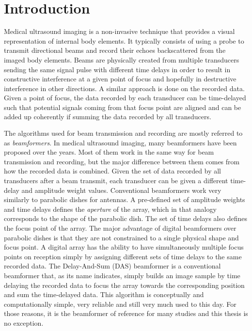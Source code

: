 \chapter{Introduction}

Medical ultrasound imaging is a non-invasive technique that provides a visual representation of internal body elements. It typically consists of using a probe to transmit directional beams and record their echoes backscattered from the imaged body elements. 
Beams are physically created from multiple transducers sending the same signal pulse with different time delays in order to result in constructive interference at a given point of focus and hopefully in destructive interference in other directions.
A similar approach is done on the recorded data. Given a point of focus, the data recorded by each transducer can be time-delayed such that potential signals coming from that focus point are aligned and can be added up coherently if summing the data recorded by all transducers.

The algorithms used for beam transmission and recording are mostly referred to as \textit{beamformers}. In medical ultrasound imaging, many beamformers have been proposed over the years. Most of them work in the same way for beam transmission and recording, but the major difference between them comes from how the recorded data is combined.
Given the set of data recorded by all transducers after a beam transmit, each transducer can be given a different time-delay and amplitude weight values.
Conventional beamformers work very similarly to parabolic dishes for antennas. A pre-defined set of amplitude weights and time delays defines the \textit{aperture} of the array, which in that analogy corresponds to the shape of the parabolic dish. The set of time delays also defines the focus point of the array. The major advantage of digital beamformers over parabolic dishes is that they are not constrained to a single physical shape and focus point. A digital array has the ability to have simultaneously multiple focus points on reception simply by assigning different sets of time delays to the same recorded data.
The Delay-And-Sum (DAS) beamformer is a conventional beamformer that, as its name indicates, simply builds an image sample by time delaying the recorded data to focus the array towards the corresponding position and sum the time-delayed data. This algorithm is conceptually and computationally simple, very reliable and still very much used to this day. For those reasons, it is the beamformer of reference for many studies and this thesis is no exception.

